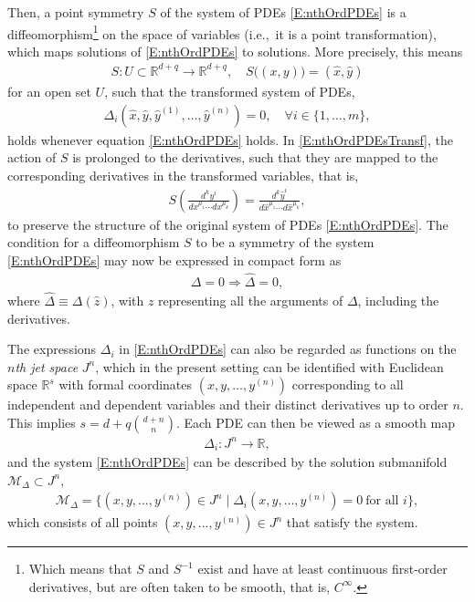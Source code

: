 \documentclass[a4paper,hidelinks, 12pt]{article}
\numberwithin{equation}{section}
\theoremstyle{plain}
\newcommand{\N}[1]{\mathbb{#1}}
\begin{document}
Then, a point symmetry $S$ of the system of PDEs \eqref{E:nthOrdPDEs}
is a diffeomorphism\footnote{Which means that $S$ and $S^{-1}$ exist and have at least continuous first-order derivatives, but are often taken to be smooth, that is, $C^\infty$. %
} on the space of variables (i.e.,~it is a point transformation), which maps solutions of \eqref{E:nthOrdPDEs}
to solutions. More precisely, this means
\begin{align}
	S: U\subset \N{R}^{d+q} \to \N{R}^{d+q},\quad S\big((x,y)\big)= (\hat{x},\hat{y})
\end{align}
for an open set $U$, such that the transformed system of PDEs,
\begin{align}\label{E:nthOrdPDEsTransf}
	\Delta_i(\hat{x},\hat{y},\hat{y}^{(1)},\ldots, \hat{y}^{(n)})=0, \quad \forall i\in \{1,\ldots,m\}, 
\end{align}
 holds whenever equation \eqref{E:nthOrdPDEs} holds. In \eqref{E:nthOrdPDEsTransf}, the action of $S$ is prolonged to the derivatives, such that they are mapped to the corresponding derivatives in the transformed variables, that is,
\begin{align}
	S(\frac{d^k {y}^i}{d{x}^{\mu_1}\cdots d{x}^{\mu_k}})=\frac{d^k \hat{y}^i}{d\hat{x}^{\mu_1}\cdots d\hat{x}^{\mu_k}},
\end{align}
to preserve the structure of the original system of PDEs \eqref{E:nthOrdPDEs}. 
The condition for a diffeomorphism $S$ to be a symmetry of the system \eqref{E:nthOrdPDEs}
may now be expressed in compact form as 
\begin{align}
	\Delta =0 \Rightarrow \hat{\Delta} =0,
\end{align}
where $\hat{\Delta}\equiv \Delta(\hat{z})$, with $z$ representing all
 the arguments of $\Delta$, including the derivatives.

The expressions $\Delta_i$ in \eqref{E:nthOrdPDEs} can also be regarded as
functions on the \emph{$n$th jet space} $J^n$, which in the present setting
can be identified with Euclidean space $\mathbb{R}^s$ with formal coordinates
$(x,y,\ldots,y^{(n)})$ corresponding to all independent and dependent variables
and their distinct derivatives up to order $n$. This implies
$s = d + q\binom{d+n}{n}$. Each PDE can then be viewed as a smooth map
\begin{align}
  \Delta_i : J^n \to \mathbb{R},
\end{align}
and the system \eqref{E:nthOrdPDEs} can be described by the solution submanifold
$\mathcal{M}_\Delta \subset J^n$,
\begin{align}\label{E:solManifold}
  \mathcal{M}_\Delta
  = \bigl\{ (x,y,\ldots,y^{(n)}) \in J^n \;\big|\;
     \Delta_i(x,y,\ldots,y^{(n)}) = 0 \ \text{for all } i  \bigr\},
\end{align}
which consists of all points $(x,y,\ldots,y^{(n)}) \in J^n$ that satisfy the system. 
\end{document}
